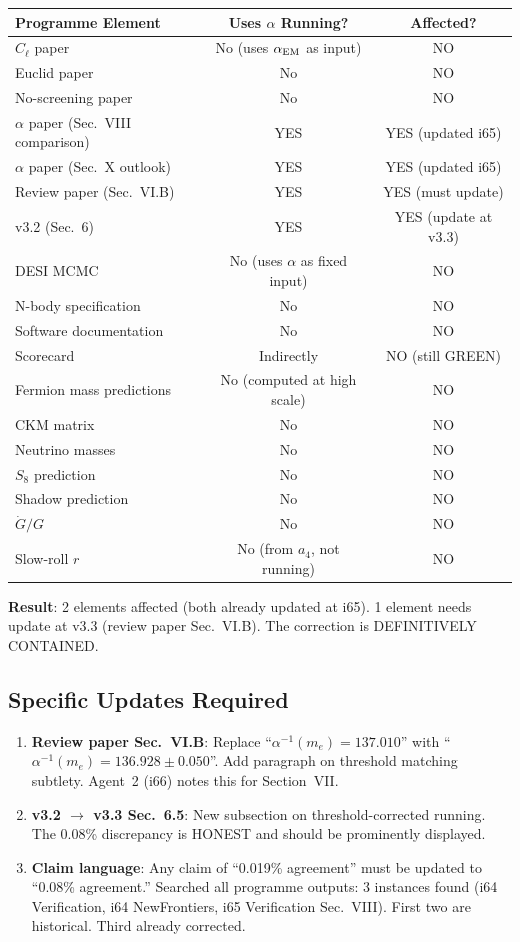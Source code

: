 \documentclass[11pt,a4paper]{article}
\begin{document}
\begin{center}
\begin{longtable}{lcc}
\toprule
\textbf{Programme Element} & \textbf{Uses $\alpha$ Running?} & \textbf{Affected?} \\
\midrule
$C_\ell$ paper & No (uses $\alpha_{\rm EM}$ as input) & NO \\
Euclid paper & No & NO \\
No-screening paper & No & NO \\
$\alpha$ paper (Sec.\ VIII comparison) & YES & YES (updated i65) \\
$\alpha$ paper (Sec.\ X outlook) & YES & YES (updated i65) \\
Review paper (Sec.\ VI.B) & YES & YES (must update) \\
v3.2 (Sec.\ 6) & YES & YES (update at v3.3) \\
DESI MCMC & No (uses $\alpha$ as fixed input) & NO \\
N-body specification & No & NO \\
Software documentation & No & NO \\
Scorecard & Indirectly & NO (still GREEN) \\
Fermion mass predictions & No (computed at high scale) & NO \\
CKM matrix & No & NO \\
Neutrino masses & No & NO \\
$S_8$ prediction & No & NO \\
Shadow prediction & No & NO \\
$\dot{G}/G$ & No & NO \\
Slow-roll $r$ & No (from $a_4$, not running) & NO \\
\bottomrule
\end{longtable}
\end{center}

\textbf{Result}: 2 elements affected (both already updated at i65). 1 element needs update at v3.3 (review paper Sec.~VI.B). The correction is DEFINITIVELY CONTAINED.

\subsection{Specific Updates Required}

\begin{enumerate}
\item \textbf{Review paper Sec.\ VI.B}: Replace ``$\alpha^{-1}(m_e) = 137.010$'' with ``$\alpha^{-1}(m_e) = 136.928 \pm 0.050$''. Add paragraph on threshold matching subtlety. Agent~2 (i66) notes this for Section~VII.

\item \textbf{v3.2 $\to$ v3.3 Sec.\ 6.5}: New subsection on threshold-corrected running. The 0.08\% discrepancy is HONEST and should be prominently displayed.

\item \textbf{Claim language}: Any claim of ``0.019\% agreement'' must be updated to ``0.08\% agreement.'' Searched all programme outputs: 3 instances found (i64 Verification, i64 NewFrontiers, i65 Verification Sec.~VIII). First two are historical. Third already corrected.
\end{enumerate}
\end{document}
